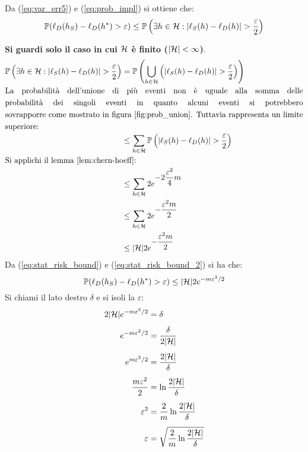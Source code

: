 Da (\ref{eq:var_err5}) e (\ref{eq:prob_impl}) si ottiene che:
\begin{equation}
    \Prob(\ell_D(h_S)-\ell_D(h^*)>\varepsilon) \leq
    \Prob\left(\exists h \in \Hpred : |\ell_S(h)-\ell_D(h)|>\frac{\varepsilon}{2}
    \right) \label{eq:stat_risk_bound}
\end{equation}

\begin{figure}[ht]
    \centering
    
    \caption{\label{fig:prob_union}}
\end{figure}

\textbf{Si guardi solo il caso in cui $\mathcal{H}$ è finito ($|\mathcal{H}|<\infty$)}.
\begin{align}
\Prob\left(\exists h \in \Hpred : |\ell_S(h)-\ell_D(h)|>\frac{\varepsilon}{2}\right)
&= \Prob\left(\bigcup_{h\in\Hpred} \left(|\ell_S(h)-\ell_D(h)|>
\frac{\varepsilon}{2}\right)\right)\notag\\
\multispan2{La probabilità dell'unione di più eventi non è uguale alla somma delle}\notag\\
\multispan2{probabilità dei singoli eventi in quanto alcuni eventi si potrebbero}\notag\\
\multispan2{sovrapporre come mostrato in figura \ref{fig:prob_union}. 
Tuttavia rappresenta un limite}\notag\\
\multispan2{superiore:\hfill}\notag\\
&\leq \sum_{h\in\Hpred}\Prob\left(|\ell_S(h)-\ell_D(h)|>\frac{\varepsilon}{2}\right)\notag\\
\multispan2{Si applichi il lemma \ref{lem:chern-hoeff}:\hfill}\notag\\
&\leq \sum_{h\in\Hpred}  2e^{\displaystyle-2\frac{\varepsilon^2}{4}m}\notag\\
&\leq \sum_{h\in\Hpred}  2e^{\displaystyle-\frac{\varepsilon^2m}{2}}\notag\\
&\leq |\Hpred|  2e^{\displaystyle-\frac{\varepsilon^2m}{2}}\label{eq:stat_risk_bound_2}
\end{align}
Da (\ref{eq:stat_risk_bound}) e (\ref{eq:stat_risk_bound_2}) si ha che:
\begin{equation}
\mathbb{P}(\ell_D(h_S)-\ell_D(h^*)>\varepsilon) \leq
|\mathcal{H}|2e^{-m\varepsilon^2/2}
\label{eq:stat_risk_bound_3}
\end{equation}
Si chiami il lato destro $\delta$ e si isoli la $\varepsilon$:
\begin{align}
    2|\mathcal{H}|e^{-m\varepsilon^2/2} &= \delta\label{eq:stat_risk_bound_3}\\[.15cm]
    e^{-m\varepsilon^2/2} &= \frac{\delta}{2|\mathcal{H}|}\notag\\[.15cm]
    e^{m\varepsilon^2/2} &= \frac{2|\mathcal{H}|}{\delta}\notag\\[.15cm]
    \frac{m\varepsilon^2}{2} &= \ln{\frac{2|\ensuremath{\mathcal{H}}|}{\delta}}\notag\\[.15cm]
    \varepsilon^2 &= \frac{2}{m}\ln{\frac{2|\ensuremath{\mathcal{H}}|}{\delta}}\notag\\[.15cm]
    \varepsilon &= \sqrt{\frac{2}{m}\ln{\frac{2|\ensuremath{\mathcal{H}}|}{\delta}}}\label{eq:stat_risk_bound_4}
\end{align}
